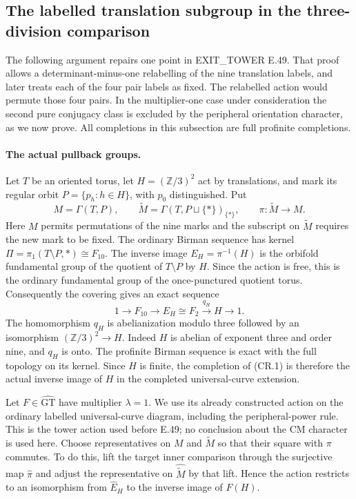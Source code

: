 \subsection{The labelled translation subgroup in the three-division comparison}

The following argument repairs one point in EXIT\_TOWER E.49.  That
proof allows a determinant-minus-one relabelling of the nine translation
labels, and later treats each of the four pair labels as fixed.  The
relabelled action would permute those four pairs.  In the multiplier-one
case under consideration the second pure conjugacy class is excluded by
the peripheral orientation character, as we now prove.  All completions
in this subsection are full profinite completions.

\paragraph{The actual pullback groups.}
Let $T$ be an oriented torus, let
$H=(\mathbb Z/3)^2$ act by translations, and mark its regular orbit
$P=\{p_h:h\in H\}$, with $p_0$ distinguished.  Put
\[
 M=\Gamma(T,P),\qquad
 \widetilde M=\Gamma(T,P\sqcup\{*\})_{\{*\}},
 \qquad \pi:\widetilde M\longrightarrow M.
\]
Here $M$ permits permutations of the nine marks and the subscript on
$\widetilde M$ requires the new mark to be fixed.  The ordinary Birman
sequence has kernel
$\Pi=\pi_1(T\setminus P,*)\cong F_{10}$.
The inverse image $E_H=\pi^{-1}(H)$ is the orbifold fundamental group
of the quotient of $T\setminus P$ by $H$.  Since the action is free,
this is the ordinary fundamental group of the once-punctured quotient
torus.  Consequently the covering gives an exact sequence
\[
 1\longrightarrow F_{10}\longrightarrow E_H\cong F_2
       \xrightarrow{q_H}H\longrightarrow1.                 \tag{CR.1}
\]
The homomorphism $q_H$ is abelianization modulo three followed by an
isomorphism $(\mathbb Z/3)^2\to H$.  Indeed $H$ is abelian of exponent
three and order nine, and $q_H$ is onto.  The profinite Birman sequence
is exact with the full topology on its kernel.  Since $H$ is finite,
the completion of (CR.1) is therefore the actual inverse image of $H$
in the completed universal-curve extension.

Let $F\in\widehat{\mathrm{GT}}$ have multiplier $\lambda=1$.
We use its already constructed action on the ordinary labelled
universal-curve diagram, including the peripheral-power rule.  This is
the tower action used before E.49; no conclusion about the CM
character is used here.  Choose representatives on $M$ and
$\widetilde M$ so that their square with $\pi$ commutes.  To do this,
lift the target inner comparison through the surjective map
$\widehat\pi$ and adjust the representative on
$\widehat{\widetilde M}$ by that lift.  Hence the action restricts to
an isomorphism from $\widehat E_H$ to the inverse image of $F(H)$.

